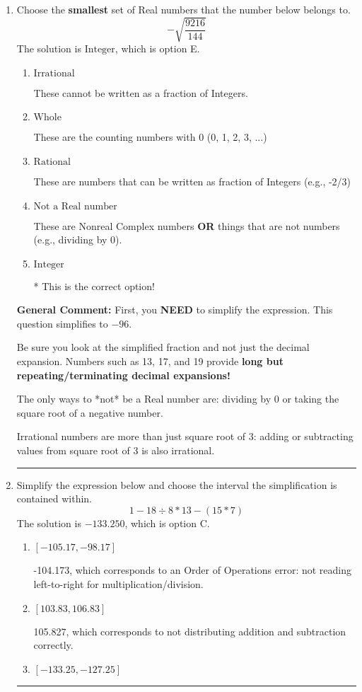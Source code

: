 \documentclass{extbook}[14pt]
\newcommand{\litem}[1]{\item #1

\rule{\textwidth}{0.4pt}}
\begin{document}
\begin{enumerate}\litem{
Choose the \textbf{smallest} set of Real numbers that the number below belongs to.
\[ -\sqrt{\frac{9216}{144}} \]The solution is \( \text{Integer} \), which is option E.\begin{enumerate}[label=\Alph*.]
\item \( \text{Irrational} \)

These cannot be written as a fraction of Integers.
\item \( \text{Whole} \)

These are the counting numbers with 0 (0, 1, 2, 3, ...)
\item \( \text{Rational} \)

These are numbers that can be written as fraction of Integers (e.g., -2/3)
\item \( \text{Not a Real number} \)

These are Nonreal Complex numbers \textbf{OR} things that are not numbers (e.g., dividing by 0).
\item \( \text{Integer} \)

* This is the correct option!
\end{enumerate}

\textbf{General Comment:} First, you \textbf{NEED} to simplify the expression. This question simplifies to $-96$. 
 
 Be sure you look at the simplified fraction and not just the decimal expansion. Numbers such as 13, 17, and 19 provide \textbf{long but repeating/terminating decimal expansions!} 
 
 The only ways to *not* be a Real number are: dividing by 0 or taking the square root of a negative number. 
 
 Irrational numbers are more than just square root of 3: adding or subtracting values from square root of 3 is also irrational.
}
\litem{
Simplify the expression below and choose the interval the simplification is contained within.
\[ 1 - 18 \div 8 * 13 - (15 * 7) \]The solution is \( -133.250 \), which is option C.\begin{enumerate}[label=\Alph*.]
\item \( [-105.17, -98.17] \)

 -104.173, which corresponds to an Order of Operations error: not reading left-to-right for multiplication/division.
\item \( [103.83, 106.83] \)

 105.827, which corresponds to not distributing addition and subtraction correctly.
\item \( [-133.25, -127.25] \)


\end{enumerate}}
\end{enumerate}
\end{document}
